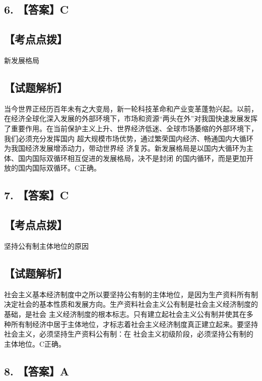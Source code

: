 \documentclass[UTF8,11pt]{ctexart}
\begin{document}
\subsection*{6. 【答案】C}

\subsection*{【考点点拨】}

新发展格局


\subsection*{【试题解析】}

当今世界正经历百年未有之大变局，新一轮科技革命和产业变革蓬勃兴起。以前，在经济全球化深入发展的外部环境下，市场和资源“两头在外”对我国快速发展发挥了重要作用。在当前保护主义上升、世界经济低迷、全球市场萎缩的外部环境下，我们必须充分发挥国内 超大规模市场优势，通过繁荣国内经济、畅通国内大循环为我国经济发展增添动力，带动世界经 济复苏。新发展格局是以国内大循环为主体、国内国际双循环相互促进的发展格局，决不是封闭 的国内循环，而是更加开放的国内国际双循环。C正确。


\subsection*{7. 【答案】C}

\subsection*{【考点点拨】}

坚持公有制主体地位的原因


\subsection*{【试题解析】}

社会主义基本经济制度中之所以要坚持公有制的主体地位，是因为生产资料所有制决定社会的基本性质和发展方向。生产资料社会主义公有制是社会主义经济制度的基础，是社会 主义经济制度的根本标志。只有建立起社会主义公有制并使其在多种所有制经济中居于主体地位，才标志着社会主义经济制度真正建立起来。要坚持社会主义，必须坚持生产资料公有制：在 社会主义初级阶段，必须坚持公有制的主体地位。C正确。


\subsection*{8. 【答案】A}
\end{document}
